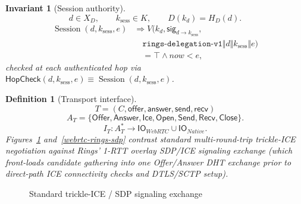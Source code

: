 \documentclass[journal]{IEEEtran}
\newtheorem{definition}{Definition}
\newtheorem{invariant}{Invariant}
\begin{document}
\begin{invariant}[Session authority]
\[
  d\in X_D,\qquad k_{\mathrm{sess}}\in K,\qquad D(k_d)=H_D(d).
\]
\[
\begin{aligned}
  \operatorname{Session}(d,k_{\mathrm{sess}},e) &\Rightarrow V\bigl(k_d,\mathsf{sig}_{d\to k_{\mathrm{sess}}},\\
  &\quad\mathtt{rings\mbox{-}delegation\mbox{-}v1}\Vert d\Vert k_{\mathrm{sess}}\Vert e\bigr)\\
  &\quad=\top\land now<e,
\end{aligned}
\]
checked at each authenticated hop via $\mathsf{HopCheck}(d,k_{\mathrm{sess}},e)\equiv\operatorname{Session}(d,k_{\mathrm{sess}},e)$.
\end{invariant}

\begin{definition}[Transport interface]
\[
  T=(C,\mathsf{offer},\mathsf{answer},\mathsf{send},\mathsf{recv})
\]
\[
  A_T=\{\mathsf{Offer},\mathsf{Answer},\mathsf{Ice},\mathsf{Open},
        \mathsf{Send},\mathsf{Recv},\mathsf{Close}\}.
\]
\[
  I_T:A_T^*\to\mathsf{IO}_{WebRTC}\cup\mathsf{IO}_{Native}.
\]
Figures~\ref{webrtc-standard-sdp} and~\ref{webrtc-rings-sdp} contrast standard multi-round-trip trickle-ICE negotiation against Rings' 1-RTT overlay SDP/ICE signaling exchange (which front-loads candidate gathering into one Offer/Answer DHT exchange prior to direct-path ICE connectivity checks and DTLS/SCTP setup).
\end{definition}

\begin{figure}[htbp]
\centering
{}
\caption{Standard trickle-ICE / SDP signaling exchange}
\label{webrtc-standard-sdp}
\end{figure}
\end{document}
